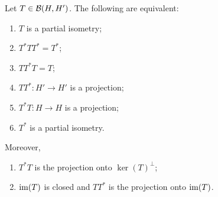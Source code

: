 \begin{proposition} \label{partialIsometryEquivalences}
Let $T\in \operatorname{\mathcal{B}}(H,H')$. The following are equivalent:
\begin{enumerate}
\item $T$ is a partial isometry;
\item $T^*TT^* = T^*$;
\item $TT^*T = T$;
\item $TT^*: H' \to H'$ is a projection;
\item $T^*T: H \to H$ is a projection;
\item $T^*$ is a partial isometry.
\end{enumerate}
Moreover,
\begin{enumerate}
\item $T^*T$ is the projection onto $\ker(T)^\perp$;
\item $\operatorname{im}(T)$ is closed and $TT^*$ is the projection onto $\operatorname{im}(T)$.
\end{enumerate}
\end{proposition}

